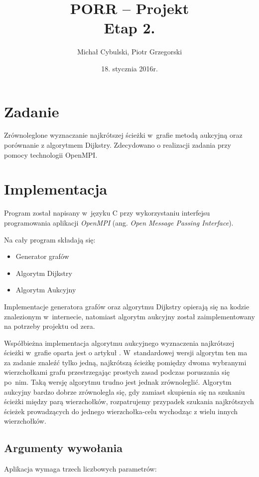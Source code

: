 \documentclass {article}
\author {Michał Cybulski, Piotr Grzegorski}
\title {PORR -- Projekt\\Etap 2.}
\date {18. stycznia 2016r.}
\begin{document}
\maketitle

\section {Zadanie}

Zrównoleglone wyznaczanie najkrótszej ścieżki w~grafie metodą aukcyjną oraz porównanie z algorytmem Dijkstry. Zdecydowano o realizacji zadania przy pomocy technologii OpenMPI.

\section{Implementacja}

Program został napisany w~języku C przy wykorzystaniu interfejsu programowania aplikacji \emph{OpenMPI} (ang. \emph{Open Message Passing Interface}).

Na cały program składają się:
\begin{itemize}
    \item Generator grafów
    \item Algorytm Dijkstry
    \item Algorytm Aukcyjny
\end{itemize}

Implementacje generatora grafów oraz algorytmu Dijkstry opierają się na kodzie znalezionym w~internecie, natomiast algorytm aukcyjny został zaimplementowany na potrzeby projektu od zera. 

Współbieżna implementacja algorytmu aukcyjnego wyznaczenia najkrótszej ścieżki w~grafie oparta jest o artykuł \cite{Bertsekas1991}. W~standardowej wersji algorytm ten ma za zadanie znaleźć tylko jedną, najkrótszą ścieżkę pomiędzy dwoma wybranymi wierzchołkami grafu przestrzegając prostych zasad podczas poruszania się po~nim. Taką wersję algorytmu trudno jest jednak zrównoleglić. Algorytm aukcyjny bardzo dobrze zrównolegla się, gdy zamiast skupienia się na szukaniu ścieżki między parą wierzchołków, rozpatrujemy przypadek szukania najkrótszych ścieżek prowadzących do jednego wierzchołka-celu wychodząc z wielu innych wierzchołków.

\subsection{Argumenty wywołania}

Aplikacja wymaga trzech liczbowych parametrów:
\end{document}
